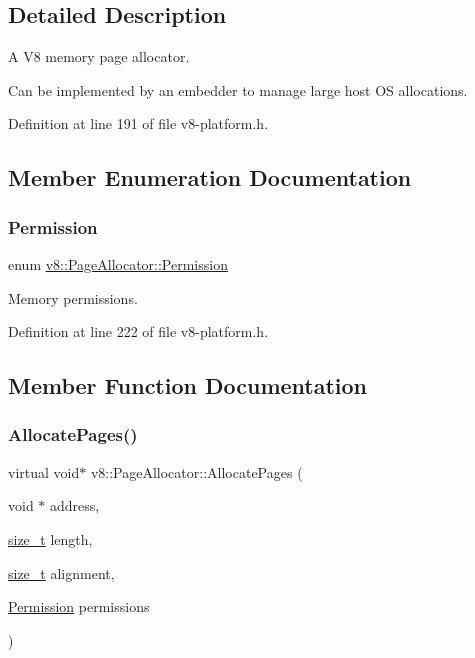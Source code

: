 \subsection{Detailed Description}
A V8 memory page allocator.

Can be implemented by an embedder to manage large host OS allocations. 

Definition at line 191 of file v8-\/platform.\+h.



\subsection{Member Enumeration Documentation}
\mbox{\label{classv8_1_1PageAllocator_a88f74b164fe97e053259f67a95758415}} 
\subsubsection{\texorpdfstring{Permission}{Permission}}
{\footnotesize\ttfamily enum \mbox{\hyperlink{classv8_1_1PageAllocator_a88f74b164fe97e053259f67a95758415}{v8\+::\+Page\+Allocator\+::\+Permission}}}

Memory permissions. 

Definition at line 222 of file v8-\/platform.\+h.



\subsection{Member Function Documentation}
\mbox{\label{classv8_1_1PageAllocator_ab3a25ddd2601701f80ee67c4bf017ef7}} 
\subsubsection{\texorpdfstring{Allocate\+Pages()}{AllocatePages()}}
{\footnotesize\ttfamily virtual void$\ast$ v8\+::\+Page\+Allocator\+::\+Allocate\+Pages (\begin{DoxyParamCaption}\item[{void $\ast$}]{address,  }\item[{\mbox{\hyperlink{classsize__t}{size\+\_\+t}}}]{length,  }\item[{\mbox{\hyperlink{classsize__t}{size\+\_\+t}}}]{alignment,  }\item[{\mbox{\hyperlink{classv8_1_1PageAllocator_a88f74b164fe97e053259f67a95758415}{Permission}}}]{permissions }\end{DoxyParamCaption})\hspace{0.3cm}{\ttfamily [pure virtual]}}

